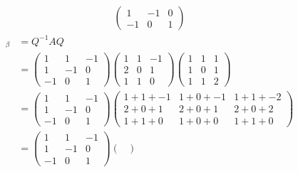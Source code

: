 \documentclass[13pt]{article}
\begin{document}
\begin{enumerate}[label=(\alph*),leftmargin=*]
\begin{align*}
\begin{pmatrix}
               1 & -1 & 0 \\
               -1 & 0 & 1
             \end{pmatrix}
  \end{align*}
  \begin{align*}
    [L_A]_\beta &= Q^{-1}AQ \\
                &=
                  \begin{pmatrix}
                    1 & 1 & -1 \\
                    1 & -1 & 0 \\
                    -1 & 0 & 1                    
                  \end{pmatrix}
                  \begin{pmatrix}
                    1 & 1 & -1 \\
                    2 & 0 & 1 \\
                    1 & 1 & 0
                  \end{pmatrix}
                  \begin{pmatrix}
                    1 & 1 & 1 \\
                    1 & 0 & 1 \\
                    1 & 1 & 2
                  \end{pmatrix} \\
                &=
                  \begin{pmatrix}
                    1 & 1 & -1 \\
                    1 & -1 & 0 \\
                    -1 & 0 & 1                    
                  \end{pmatrix}
                  \begin{pmatrix}
                    1 + 1 + -1 & 1 + 0 + -1 & 1 + 1 + -2 \\
                    2 + 0 + 1 & 2 + 0 + 1 & 2 + 0 + 2 \\
                    1 + 1 + 0 & 1 + 0 + 0 & 1 + 1 + 0
                  \end{pmatrix} \\
                &=
                  \begin{pmatrix}
                    1 & 1 & -1 \\
                    1 & -1 & 0 \\
                    -1 & 0 & 1                    
                  \end{pmatrix}
                  \begin{pmatrix}

\end{pmatrix}
\end{align*}
\end{enumerate}
\end{document}
